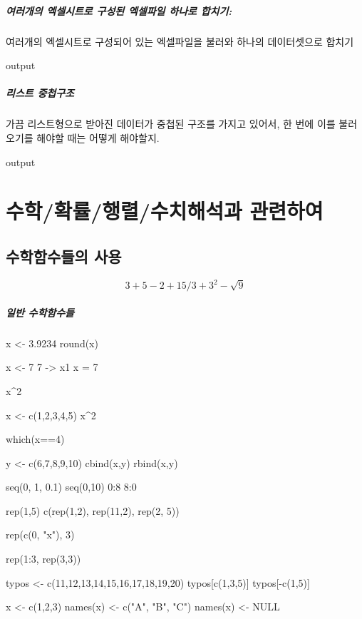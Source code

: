 \documentclass{report}
\begin{document}
\paragraph{여러개의 엑셀시트로 구성된 엑셀파일 하나로 합치기:} 여러개의 엑셀시트로 구성되어 있는 엑셀파일을 불러와 하나의 데이터셋으로 합치기
\begin{Schunk}
\begin{Soutput}
output
\end{Soutput}
\end{Schunk}

\paragraph{리스트 중첩구조} 
가끔 리스트형으로 받아진 데이터가 중첩된 구조를 가지고 있어서, 한 번에 이를 불러오기를 해야할 때는 어떻게 해야할지.
\begin{Schunk}
\begin{Soutput}
output
\end{Soutput}
\end{Schunk}



%
%
%

\chapter{수학/확률/행렬/수치해석과 관련하여}

\section{수학함수들의 사용}

\begin{equation}
3 + 5 - 2 + 15/3 + 3^2 - \sqrt{9}
\end{equation}

\paragraph{일반 수학함수들}

\begin{Schunk}
\begin{Soutput}
x <- 3.9234
round(x)

x <- 7
7 -> x1
x = 7

x^2 

x <- c(1,2,3,4,5)
x^2

which(x==4)

y <- c(6,7,8,9,10)
cbind(x,y)
rbind(x,y)


seq(0, 1, 0.1)
seq(0,10)
0:8
8:0

rep(1,5)
c(rep(1,2), rep(11,2), rep(2, 5))

rep(c(0, "x"), 3)

rep(1:3, rep(3,3))

typos <- c(11,12,13,14,15,16,17,18,19,20)
typos[c(1,3,5)]
typos[-c(1,5)]


x <- c(1,2,3)
names(x) <- c("A", "B", "C")
names(x) <- NULL


\end{Soutput}
\end{Schunk}
\end{document}
